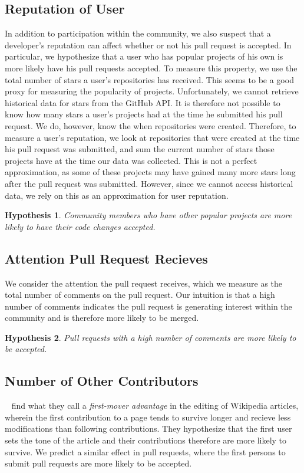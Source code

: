 \documentclass[12pt]{article}
\newtheorem{hyp}{Hypothesis}
\begin{document}
\subsection{Reputation of User}
In addition to participation within the community, we also suspect that a
developer's reputation can affect whether or not his pull request is accepted.
In particular, we hypothesize that a user who has popular projects of his own is
more likely have his pull requests accepted. To measure this property, we use
the total number of stars a user's repositories has received. This seems to be a
good proxy for measuring the popularity of projects. Unfortunately, we cannot
retrieve historical data for stars from the GitHub API. It is therefore not
possible to know how many stars a user's projects had at the time he submitted
his pull request. We do, however, know the when repositories were created.
Therefore, to measure a user's reputation, we look at repositories that were
created at the time his pull request was submitted, and sum the current number
of stars those projects have at the time our data was collected. This is not a
perfect approximation, as some of these projects may have gained many more stars
long after the pull request was submitted. However, since we cannot access
historical data, we rely on this as an approximation for user reputation.

\begin{hyp}
Community members who have other popular projects are more likely to have their
code changes accepted.
\end{hyp}

\subsection{Attention Pull Request Recieves}
We consider the attention the pull request receives, which we measure as the
total number of comments on the pull request. Our intuition is that a high
number of comments indicates the pull request is generating interest within the
community and is therefore more likely to be merged.

\begin{hyp}
Pull requests with a high number of comments are more likely to be accepted.
\end{hyp}

\subsection{Number of Other Contributors}
~\cite{viegas_studying_2004} find what they call a \textit{first-mover
advantage} in the editing of Wikipedia articles, wherein the first contribution
to a page tends to survive longer and recieve less modifications than following
contributions. They hypothesize that the first user sets the tone of the article
and their contributions therefore are more likely to survive. We predict a
similar effect in pull requests, where the first persons to submit pull requests
are more likely to be accepted.
\end{document}
